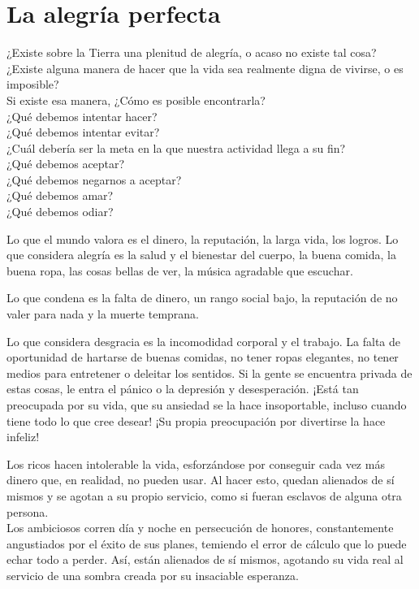 \documentclass[hidelinks]{memoir}
\begin{document}
	\chapter*{La alegría perfecta}
	
	¿Existe sobre la Tierra una plenitud de alegría, o acaso no existe tal
	cosa?\\
	¿Existe alguna manera de hacer que la vida sea realmente digna de
	vivirse, o es imposible?\\
	Si existe esa manera, ¿Cómo es posible encontrarla?\\
	¿Qué debemos intentar hacer?\\
	¿Qué debemos intentar evitar?\\
	¿Cuál debería ser la meta en la que nuestra actividad llega a su fin?\\
	¿Qué debemos aceptar?\\
	¿Qué debemos negarnos a aceptar?\\
	¿Qué debemos amar?\\
	¿Qué debemos odiar?
	
	Lo que el mundo valora es el dinero, la reputación, la larga vida, los
	logros. Lo que considera alegría es la salud y el bienestar del cuerpo,
	la buena comida, la buena ropa, las cosas bellas de ver, la música
	agradable que escuchar.
	
	Lo que condena es la falta de dinero, un rango social bajo, la
	reputación de no valer para nada y la muerte temprana.
	
	Lo que considera desgracia es la incomodidad corporal y el trabajo. La
	falta de oportunidad de hartarse de buenas comidas, no tener ropas
	elegantes, no tener medios para entretener o deleitar los sentidos. Si
	la gente se encuentra privada de estas cosas, le entra el pánico o la
	depresión y desesperación. ¡Está tan preocupada por su vida, que su
	ansiedad se la hace insoportable, incluso cuando tiene todo lo que cree
	desear! ¡Su propia preocupación por divertirse la hace infeliz!
	
	Los ricos hacen intolerable la vida, esforzándose por conseguir cada vez
	más dinero que, en realidad, no pueden usar. Al hacer esto, quedan
	alienados de sí mismos y se agotan a su propio servicio, como si fueran
	esclavos de alguna otra persona.\\
	Los ambiciosos corren día y noche en persecución de honores,
	constantemente angustiados por el éxito de sus planes, temiendo el error
	de cálculo que lo puede echar todo a perder. Así, están alienados de sí
	mismos, agotando su vida real al servicio de una sombra creada por su
	insaciable esperanza.
	
\end{document}
